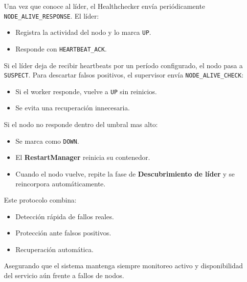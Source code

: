 Una vez que conoce al líder, el Healthchecker envía periódicamente \texttt{NODE\_ALIVE\_RESPONSE}.  
El líder:
\begin{itemize}
    \item Registra la actividad del nodo y lo marca \texttt{UP}.
    \item Responde con \texttt{HEARTBEAT\_ACK}.
\end{itemize}


Si el líder deja de recibir heartbeats por un período configurado, el nodo pasa a \texttt{SUSPECT}.  
Para descartar falsos positivos, el supervisor envía \texttt{NODE\_ALIVE\_CHECK}:
\begin{itemize}
    \item Si el worker responde, vuelve a \texttt{UP} sin reinicios.
    \item Se evita una recuperación innecesaria.
\end{itemize}


Si el nodo no responde dentro del umbral mas alto:
\begin{itemize}
    \item Se marca como \texttt{DOWN}.
    \item El \textbf{RestartManager} reinicia su contenedor.
    \item Cuando el nodo vuelve, repite la fase de \textbf{Descubrimiento de líder} y se reincorpora automáticamente.
\end{itemize}


Este protocolo combina:
\begin{itemize}
    \item Detección rápida de fallos reales.
    \item Protección ante falsos positivos.
    \item Recuperación automática.
\end{itemize}

Asegurando que el sistema mantenga siempre monitoreo activo y disponibilidad del servicio aún frente a fallos de nodos.
